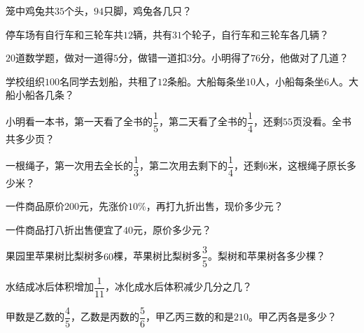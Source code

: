 \documentclass[a4paper,12pt]{ctexart}
\begin{document}

\begin{exercise}
\item 笼中鸡兔共$35$个头，$94$只脚，鸡兔各几只？

\item 停车场有自行车和三轮车共$12$辆，共有$31$个轮子，自行车和三轮车各几辆？

\item $20$道数学题，做对一道得$5$分，做错一道扣$3$分。小明得了$76$分，他做对了几道？

\item 学校组织$100$名同学去划船，共租了$12$条船。大船每条坐$10$人，小船每条坐$6$人。大船小船各几条？
\end{exercise}

\newpage


\begin{exercise}
\item 小明看一本书，第一天看了全书的$\dfrac{1}{5}$，第二天看了全书的$\dfrac{1}{4}$，还剩$55$页没看。全书共多少页？

\item 一根绳子，第一次用去全长的$\dfrac{1}{3}$，第二次用去剩下的$\dfrac{1}{4}$，还剩$6$米，这根绳子原长多少米？

\item 一件商品原价$200$元，先涨价$10\%$，再打九折出售，现价多少元？

\item 一件商品打八折出售便宜了$40$元，原价多少元？

\item 果园里苹果树比梨树多$60$棵，苹果树比梨树多$\dfrac{3}{5}$。梨树和苹果树各多少棵？

\item 水结成冰后体积增加$\dfrac{1}{11}$，冰化成水后体积减少几分之几？

\item 甲数是乙数的$\dfrac{4}{5}$，乙数是丙数的$\dfrac{5}{6}$，甲乙丙三数的和是$210$。甲乙丙各是多少？
\end{exercise}

\newpage

\end{document}
